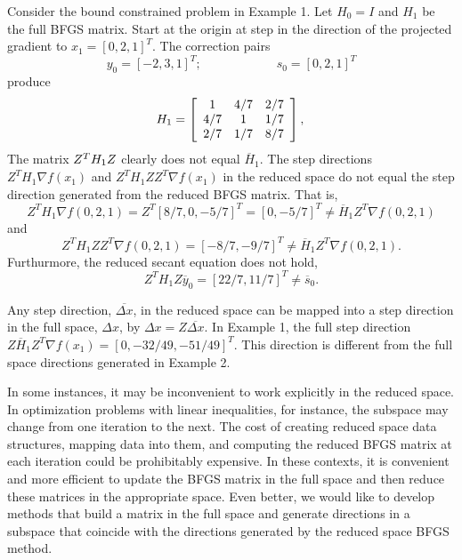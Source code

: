 \begin{example}
Consider the bound constrained problem in Example 1.
Let $H_0 = I$ and $H_1$ be the full BFGS matrix.  
Start at the origin at step in the direction of the
projected gradient to  $x_1 = [0, 2, 1]^T$.
The correction pairs
\[
y_0 = [-2, 3, 1]^T;  \hspace{1in} s_0 = [ 0, 2, 1]^T
\]
produce
\[
H_1 =
\left[     
\begin{array}{ccc}
1     & 4/7   &  2/7 \\
4/7  &  1    &  1/7 \\
2/7  &  1/7  &  8/7 \\
\end{array}
\right],
\comment{
H_1^{-1} =
\left[ \begin{array}{ccc}
11/7   & -6/7   & -2/7 \\
-6/7  &  52/35   & 1/35 \\
-2/7  & 1/35  &  33/35 \\
\end{array} \right].
}
\]
The matrix
$Z^T H_1 Z 
\comment{ = \left[     
\begin{array}{cc}
1    &  1/7 \\
1/7  &  8/7 \\
\end{array}
\right]
}
$
clearly does not equal $\overline{H}_1$.
The step directions $ Z^T {H}_{1} \nabla f(x_1) $  and
$Z^T {H}_{1} Z Z^T \nabla f(x_1)$
in the reduced space do not equal the step direction generated from the reduced BFGS matrix.
That is,
\[ Z^T H_1 \nabla f(0,2,1) = Z^T [ 8/7, 0, -5/7]^T = [ 0, -5/7]^T \neq \overline{H}_1 Z^T \nabla f(0,2,1)\]
and
\[Z^T H_1 Z Z^T \nabla f(0,2,1) = [ -8/7, -9/7]^T \neq \overline{H}_1 Z^T \nabla f(0,2,1).\]
Furthurmore, the reduced secant equation does not hold, 
\[Z^T H_1 Z \overline{y}_0 = [ 22/7 , 11/7]^T   \neq \overline{s}_0. \]
\end{example}

Any step direction, $\overline{ \Delta x}$, in the reduced space can be
mapped into a step direction in the full space, $ \Delta x$, 
by $ \Delta x = Z \overline{ \Delta x}$.  In Example 1, the full
step direction $Z  \overline{H}_1 Z^T \nabla f(x_1) = [0, -32/49, -51/49 ]^T$.
This direction is different from the full space directions
generated in Example 2.

In some instances, it may be inconvenient to work explicitly
in the reduced space.
In optimization problems with linear inequalities, 
for instance, the subspace may change from one iteration to the next.   
The cost of creating reduced space data structures, mapping data into
them, and computing the reduced BFGS matrix at each iteration could
be prohibitably expensive.
In these contexts, it
is convenient and more efficient 
to update the BFGS matrix in the full space and then
reduce these matrices in the appropriate space.
Even better,
we would like to develop methods that build a matrix in the
full space and generate directions in a subspace that coincide with
the directions generated by the reduced space BFGS method.


